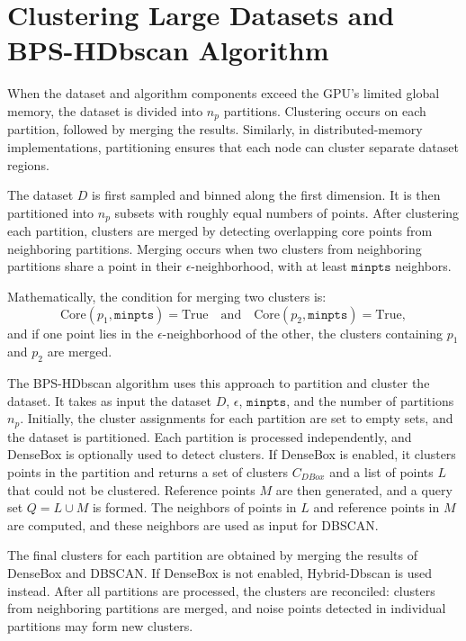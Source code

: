 \documentclass{article}
\begin{document}
\section{Clustering Large Datasets and BPS-HDbscan Algorithm}

When the dataset and algorithm components exceed the GPU's limited global memory, the dataset is divided into \(n_p\) partitions. Clustering occurs on each partition, followed by merging the results. Similarly, in distributed-memory implementations, partitioning ensures that each node can cluster separate dataset regions.

The dataset \(D\) is first sampled and binned along the first dimension. It is then partitioned into \(n_p\) subsets with roughly equal numbers of points. After clustering each partition, clusters are merged by detecting overlapping core points from neighboring partitions. Merging occurs when two clusters from neighboring partitions share a point in their \(\epsilon\)-neighborhood, with at least \(\texttt{minpts}\) neighbors.

Mathematically, the condition for merging two clusters is:
\[
\text{Core}(p_1, \texttt{minpts}) = \text{True} \quad \text{and} \quad \text{Core}(p_2, \texttt{minpts}) = \text{True},
\]
and if one point lies in the \(\epsilon\)-neighborhood of the other, the clusters containing \(p_1\) and \(p_2\) are merged.

The BPS-HDbscan algorithm uses this approach to partition and cluster the dataset. It takes as input the dataset \(D\), \(\epsilon\), \(\texttt{minpts}\), and the number of partitions \(n_p\). Initially, the cluster assignments for each partition are set to empty sets, and the dataset is partitioned. Each partition is processed independently, and DenseBox is optionally used to detect clusters. If DenseBox is enabled, it clusters points in the partition and returns a set of clusters \(C_{DBox}\) and a list of points \(L\) that could not be clustered. Reference points \(M\) are then generated, and a query set \(Q = L \cup M\) is formed. The neighbors of points in \(L\) and reference points in \(M\) are computed, and these neighbors are used as input for DBSCAN.

The final clusters for each partition are obtained by merging the results of DenseBox and DBSCAN. If DenseBox is not enabled, Hybrid-Dbscan is used instead. After all partitions are processed, the clusters are reconciled: clusters from neighboring partitions are merged, and noise points detected in individual partitions may form new clusters.
\end{document}

